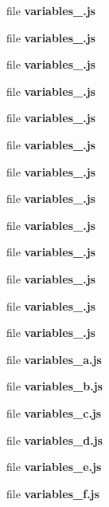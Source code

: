 \begin{DoxyCompactItemize}
file {\bf variables\+\_.\+js}
\item 
file {\bf variables\+\_.\+js}
\item 
file {\bf variables\+\_.\+js}
\item 
file {\bf variables\+\_.\+js}
\item 
file {\bf variables\+\_.\+js}
\item 
file {\bf variables\+\_.\+js}
\item 
file {\bf variables\+\_.\+js}
\item 
file {\bf variables\+\_.\+js}
\item 
file {\bf variables\+\_.\+js}
\item 
file {\bf variables\+\_.\+js}
\item 
file {\bf variables\+\_.\+js}
\item 
file {\bf variables\+\_.\+js}
\item 
file {\bf variables\+\_.\+js}
\item 
file {\bf variables\+\_\+a.\+js}
\item 
file {\bf variables\+\_\+b.\+js}
\item 
file {\bf variables\+\_\+c.\+js}
\item 
file {\bf variables\+\_\+d.\+js}
\item 
file {\bf variables\+\_\+e.\+js}
\item 
file {\bf variables\+\_\+f.\+js}
\end{DoxyCompactItemize}
